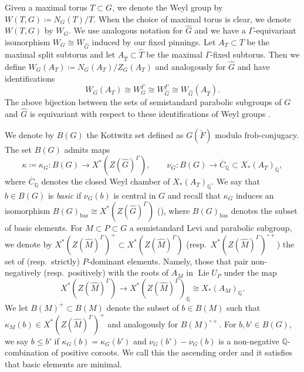 \documentclass{amsart}
\theoremstyle{definition}
\theoremstyle{remark}
\numberwithin{equation}{section}
\DeclareMathOperator{\Lie}{Lie}
\newcommand{\ov}{\overline}
\newcommand{\Q}{\mathbb{Q}}
\newcommand{\bas}{\mathrm{bas}}
\newcommand{\wh}{\widehat}
\newcommand{\frob}{\mathrm{frob}}
\begin{document}
Given a maximal torus $T \subset G$, we denote the Weyl group by $W(T,G) \coloneq N_G(T)/T$.  When the choice of maximal torus is clear, we denote $W(T,G)$ by $W_G$. We use analogous notation for $\wh{G}$ and we have a $\Gamma$-equivariant isomorphism $W_{G} \cong W_{\wh{G}}$ induced by our fixed pinnings. Let $A_T \subset T$ be the maximal split subtorus and let $A_{\wh{T}} \subset \wh{T}$ be the maximal $\Gamma$-fixed subtorus. Then we define $W_G(A_T) \coloneq N_G(A_T)/Z_G(A_T)$ and analogously for $\wh{G}$ and have identifications
\begin{equation*}
    W_G(A_T) \cong W^{\Gamma}_G \cong W^{\Gamma}_{\wh{G}} \cong W_{\wh{G}}(A_{\wh{T}}).
\end{equation*}
The above bijection between the sets of semistandard parabolic subgroups of $G$ and $\wh{G}$ is equivariant with respect to these identifications of Weyl groups \cite[Proposition 2.5.4 (ii)]{SilbergerZink}. 

We denote by $B(G)$ the Kottwitz set defined as $G(\breve{F})$ modulo $\frob$-conjugacy. The set $B(G)$ admits maps
\begin{equation*}
    \kappa\coloneq\kappa_G\colon B(G) \rightarrow X^{\ast}(Z(\wh{G})^{\Gamma}), \qquad \nu_G: B(G) \rightarrow \ov{C}_{\Q} \subset X_{\ast}(A_T)_{\Q},
\end{equation*}
where $\ov{C}_{\Q}$ denotes the closed Weyl chamber of $X_{\ast}(A_T)_{\Q}$. We say that $b \in B(G)$ is \emph{basic} if $\nu_G(b)$ is central in $G$ and recall that $\kappa_G$ induces an isomorphism $B(G)_{\bas} \cong X^{\ast}(Z(\wh{G})^{\Gamma})$ (\cite[Proposition 5.6]{kot8}), where $B(G)_{\bas}$ denotes the subset of basic elements. For $M \subset P \subset G$ a semistandard Levi and parabolic subgroup, we denote by $X^{\ast}(Z(\wh{M})^{\Gamma})^{+} \subset X^{\ast}(Z(\wh{M})^{\Gamma})$ (resp.~$X^{\ast}(Z(\wh{M})^{\Gamma})^{\circ +}$)   the set of (resp.~strictly) $P$-dominant elements. Namely, those that pair non-negatively (resp.~positively) with the roots of $A_M$ in $\Lie U_P$ under the map
\begin{equation*}
    X^{\ast}(Z(\wh{M})^{\Gamma}) \to X^{\ast}(Z(\wh{M})^{\Gamma})_{\Q} \cong X_{\ast}(A_M)_{\Q}.
\end{equation*}
We let $B(M)^+ \subset B(M)$ denote the subset of $b \in B(M)$ such that $\kappa_M(b) \in X^{\ast}(Z(\wh{M})^{\Gamma})^+$ and analogously for $B(M)^{\circ +}$. For $b, b' \in B(G)$, we say $b \leq b'$ if $\kappa_G(b) = \kappa_G(b')$ and $\nu_G(b') - \nu_G(b)$ is a non-negative $\Q$-combination of positive coroots. We call this the ascending order and it satisfies that basic elements are minimal.
 
\end{document}
